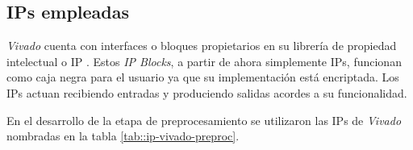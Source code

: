 \documentclass[../../main.tex]{subfiles}
\begin{document}

\subsection{IPs empleadas}
\textit{Vivado} cuenta con interfaces o bloques propietarios en su librería de propiedad intelectual o IP \cite{IP-Xilinx}. Estos \textit{IP Blocks}, a partir de ahora simplemente IPs, funcionan como caja negra para el usuario ya que su implementación está encriptada. Los IPs actuan recibiendo entradas y produciendo salidas acordes a su funcionalidad.

En el desarrollo de la etapa de preprocesamiento se utilizaron las IPs de \textit{Vivado} nombradas en la tabla \ref{tab::ip-vivado-preproc}.
\end{document}
